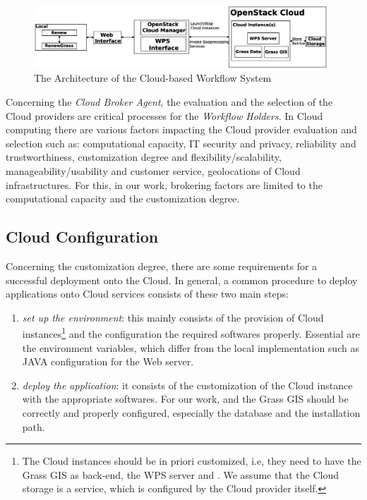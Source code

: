 \begin{figure}[!t]
    \centering
  \includegraphics[width=0.98\textwidth,height=0.20\textheight]{images/GrassMigration}
\caption{The Architecture of the Cloud-based Workflow System}
\label{fig:architecture}
\end{figure}



Concerning the \textit{Cloud Broker Agent}, the evaluation and the selection of the Cloud providers are critical processes for the \textit{Workflow Holders}.
%
In Cloud computing there are various factors impacting the Cloud provider evaluation and selection \cite{Haddad11,Badger+11a} such as: computational capacity, IT security and privacy, reliability and trustworthiness, customization degree and flexibility/scalability, manageability/usability and customer service, geolocations of Cloud infrastructures. 
%
For this, in our work, brokering factors are limited to the computational capacity and the customization degree. 

%
\subsection{Cloud Configuration}
%
Concerning the customization degree, there are some requirements for a successful deployment onto the Cloud.
%
In general, a common procedure to deploy applications onto Cloud services consists of these two main steps: 
%
\begin{enumerate}
 \item 
 \textit{set up the environment}: 
 this mainly consists of the provision of Cloud instances\footnote{The Cloud instances should be in priori customized, i.e, they need to have the Grass GIS as back-end, the WPS server and \Renew{}.
 We assume that the Cloud storage is a service, which is configured by the Cloud provider itself.
 } and the configuration the required softwares properly.
 Essential are the environment variables, which differ from the local implementation such as JAVA configuration for the Web server.
 \item
 \textit{deploy the application}: it consists of the customization of the Cloud instance with the appropriate softwares. 
 For our work, \Renew{} and the Grass GIS should be correctly and properly configured, especially the database and the installation path.
 
 \end{enumerate}
 

